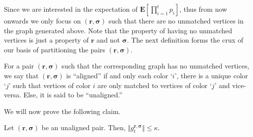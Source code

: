 \documentclass{toc}
\begin{document}
Since we are interested in the expectation of $\mathbf{E}[\prod_{i=1}^t p_i]$, thus from now onwards we only focus on $(\mathbf{r}, \boldsymbol{\sigma})$ such that there are no unmatched vertices in the graph generated above. Note that the property of having no unmatched vertices is just a property of $\mathbf{r}$ and not $\boldsymbol{\sigma}$. The next definition forms the crux  of our basis of partitioning the pairs $(\mathbf{r}, \boldsymbol{\sigma})$. 
\begin{definition}
For a pair $(\mathbf{r}, \boldsymbol{\sigma})$ such that the corresponding graph has no unmatched vertices, we say that $(\mathbf{r}, \boldsymbol{\sigma})$ is ``aligned'' if and only each color `$i$', there is a unique color `$j$' such that vertices of color $i$ are only matched to vertices of color `$j$' and vice-versa. Else, it is said to be ``unaligned.''
\end{definition}
We will now prove the following claim. 
\begin{claim}\label{clm:approx-error2}
Let $(\mathbf{r}, \boldsymbol{\sigma})$ be an unaligned pair. Then,  $\Vert g^{\mathbf{r}, \boldsymbol{\sigma}}_t \Vert \le \kappa$.  \end{claim}
\end{document}
